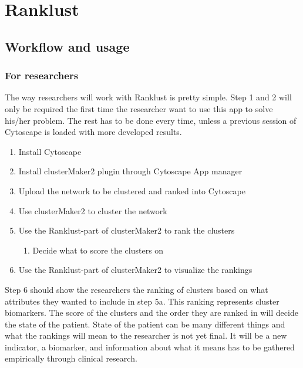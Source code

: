\part{Ranklust}
\label{pa:ranklust}
\chapter{Workflow and usage}
\section{For researchers}
The way researchers will work with Ranklust is pretty simple. Step 1 and 2 will
only be required the first time the researcher want to use this app to solve
his/her problem. The rest has to be done every time, unless a previous session
of Cytoscape is loaded with more developed results.

\begin{enumerate}
    \item Install Cytoscape
    \item Install clusterMaker2 plugin through Cytoscape App manager
    \item Upload the network to be clustered and ranked into Cytoscape
    \item Use clusterMaker2 to cluster the network
    \item Use the Ranklust-part of clusterMaker2 to rank the clusters
        \begin{enumerate}
            \item Decide what to score the clusters on
        \end{enumerate}
    \item Use the Ranklust-part of clusterMaker2 to visualize the rankings
\end{enumerate}

Step 6 should show the researchers the ranking of clusters based on what
attributes they wanted to include in step 5a. This ranking represents cluster
biomarkers. The score of the clusters and the order they are ranked in will
decide the state of the patient. State of the patient can be many different
things and what the rankings will mean to the researcher is not yet final. It
will be a new indicator, a biomarker, and information about what it means has to
be gathered empirically through clinical research.
